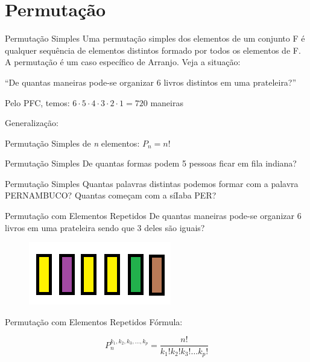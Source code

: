 \documentclass[aspectratio=169,xcolor=dvipsnames]{beamer}
\begin{document}
\section{Permutação}
\begin{frame}{Permutação Simples}
    Uma permutação simples dos elementos de um conjunto F é qualquer sequência de elementos distintos formado por todos os elementos de F. A permutação é um caso específico de Arranjo. Veja a situação:
    \vspace{.5cm}

    ``De quantas maneiras pode-se organizar 6 livros distintos em uma prateleira?''
    \vspace{.5cm}

    Pelo PFC, temos: $6 \cdot 5 \cdot 4 \cdot 3 \cdot 2 \cdot 1 = 720$ maneiras
    \vspace{.5cm}

    Generalização:

    Permutação Simples de \textit{n} elementos: $P_n = n!$

\end{frame}

\begin{frame}{Permutação Simples}
    De quantas formas podem 5 pessoas ficar em fila indiana?
\end{frame}

\begin{frame}{Permutação Simples}
    Quantas palavras distintas podemos formar com a palavra PERNAMBUCO? Quantas começam com a síIaba PER?
\end{frame}

\begin{frame}{Permutação com Elementos Repetidos}
    De quantas maneiras pode-se organizar 6 livros em uma prateleira sendo que 3 deles são iguais?
      \begin{figure}[htb!]
        \centering
        \includegraphics[width=.3\linewidth]{images/im3.png}
      \end{figure}
\end{frame}

\begin{frame}{Permutação com Elementos Repetidos}
    Fórmula:

    \begin{equation*}
        P_n^{k_1, k_2, k_3, \dots , k_p} = \dfrac{n!}{k_1!k_2!k_3!\dots k_p!}
    \end{equation*}
\end{frame}
\end{document}
